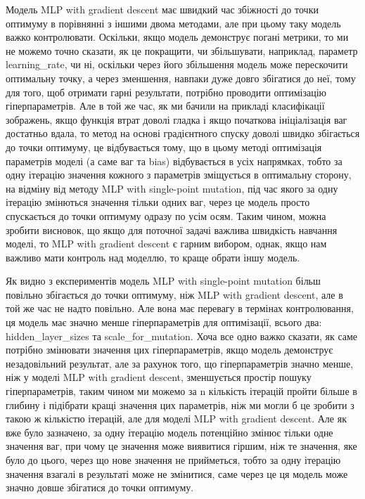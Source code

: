 Модель MLP with gradient descent має швидкий час збіжності до точки оптимуму в порівнянні з іншими двома методами, але при цьому таку модель важко контролювати. Оскільки, якщо модель демонструє погані метрики, то ми не можемо точно сказати, як це покращити, чи збільшувати, наприклад, параметр learning\_rate, чи ні, оскільки через його збільшення модель може перескочити оптимальну точку, а через зменшення, навпаки дуже довго збігатися до неї, тому для того, щоб отримати гарні результати, потрібно проводити оптимізацію гіперпараметрів. Але в той же час, як ми бачили на прикладі класифікації зображень, якщо функція втрат доволі гладка і якщо початкова ініціалізація ваг достатньо вдала, то метод на основі градієнтного спуску доволі швидко збігається до точки оптимуму, це відбувається тому, що в цьому методі оптимізація параметрів моделі (а саме ваг та bias) відбувається в усіх напрямках, тобто за одну ітерацію значення кожного з параметрів зміщується в оптимальну сторону, на відміну від методу MLP with single-point mutation, під час якого за одну ітерацію змінються значення тільки одних ваг, через це модель просто спускається до точки оптимуму одразу по усім осям. Таким чином, можна зробити висновок, що якщо для поточної задачі важлива швидкість навчання моделі, то MLP with gradient descent є гарним вибором, однак, якщо нам важливо мати контроль над моделлю, то краще обрати іншу модель.

Як видно з експериментів модель MLP with single-point mutation більш повільно збігається до точки оптимуму, ніж MLP with gradient descent, але в той же час не надто повільно. Але вона має перевагу в термінах контролювання, ця модель має значно менше гіперпараметрів для оптимізації, всього два: hidden\_layer\_sizes та scale\_for\_mutation. Хоча все одно важко сказати, як саме потрібно змінювати значення цих гіперпараметрів, якщо модель демонструє незадовільний результат, але за рахунок того, що гіперпараметрів значно менше, ніж у моделі MLP with gradient descent, зменшується простір пошуку гіперпараметрів, таким чином ми можемо за n кількість ітерацій пройти більше в глибину і підібрати кращі значення цих параметрів, ніж ми могли б це зробити з такою ж кількістю ітерацій, але для моделі MLP with gradient descent. Але як вже було зазначено, за одну ітерацію модель потенційно змінює тільки одне значення ваг, при чому це значення може виявитися гіршим, ніж те значення, яке було до цього, через що нове значення не прийметься, тобто за одну ітерацію значення взагалі в результаті може не змінитися, саме через це ця модель може значно довше збігатися до точки оптимуму.


